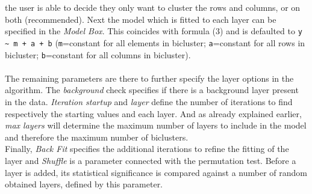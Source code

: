\documentclass[a4paper]{article}\usepackage[]{graphicx}\usepackage[]{color}
\begin{document}
the user is able to decide they only want to cluster the rows and columns, or on
both (recommended). Next the model which is fitted to each layer can be
specified in the {\it Model Box}. This coincides with formula (3) and is
defaulted to \verb|y ~ m + a + b| (\verb|m|=constant for all elements in
bicluster; \verb|a|=constant for all rows in bicluster; \verb|b|=constant for all columns in
bicluster).
\\ \\
\noindent The remaining parameters are there to further specify the layer
options in the algorithm. The {\it background} check specifies if there is a
background layer present in the data. {\it Iteration startup} and {\it layer}
define the number of iterations to find respectively the starting values and
each layer. And as already explained earlier, {\it max layers} will determine
the maximum number of layers to include in the model and therefore the maximum
number of biclusters. \\
Finally, {\it Back Fit} specifies the additional iterations to refine the
fitting of the layer and {\it Shuffle} is a parameter connected with the
permutation test. Before a layer is added, its statistical significance is
compared against a number of random obtained layers, defined by this parameter.
\end{document}
